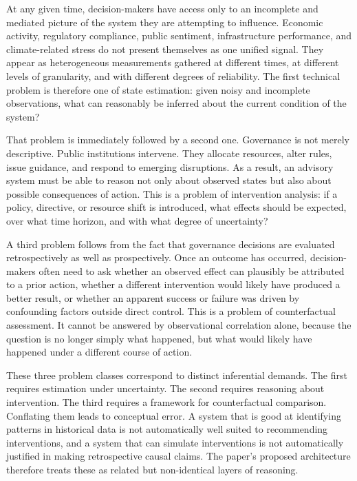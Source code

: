 \documentclass[11pt]{article}
\begin{document}
At any given time, decision-makers have access only to an incomplete and mediated picture of the system they are attempting to influence. Economic activity, regulatory compliance, public sentiment, infrastructure performance, and climate-related stress do not present themselves as one unified signal. They appear as heterogeneous measurements gathered at different times, at different levels of granularity, and with different degrees of reliability. The first technical problem is therefore one of state estimation: given noisy and incomplete observations, what can reasonably be inferred about the current condition of the system?

That problem is immediately followed by a second one. Governance is not merely descriptive. Public institutions intervene. They allocate resources, alter rules, issue guidance, and respond to emerging disruptions. As a result, an advisory system must be able to reason not only about observed states but also about possible consequences of action. This is a problem of intervention analysis: if a policy, directive, or resource shift is introduced, what effects should be expected, over what time horizon, and with what degree of uncertainty?

A third problem follows from the fact that governance decisions are evaluated retrospectively as well as prospectively. Once an outcome has occurred, decision-makers often need to ask whether an observed effect can plausibly be attributed to a prior action, whether a different intervention would likely have produced a better result, or whether an apparent success or failure was driven by confounding factors outside direct control. This is a problem of counterfactual assessment. It cannot be answered by observational correlation alone, because the question is no longer simply what happened, but what would likely have happened under a different course of action.

These three problem classes correspond to distinct inferential demands. The first requires estimation under uncertainty. The second requires reasoning about intervention. The third requires a framework for counterfactual comparison. Conflating them leads to conceptual error. A system that is good at identifying patterns in historical data is not automatically well suited to recommending interventions, and a system that can simulate interventions is not automatically justified in making retrospective causal claims. The paper's proposed architecture therefore treats these as related but non-identical layers of reasoning.
\end{document}
